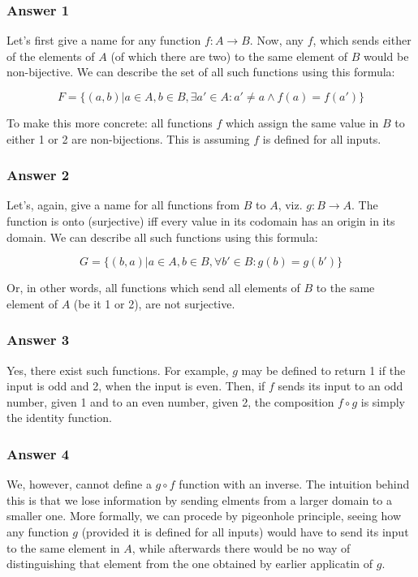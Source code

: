 \documentclass[11pt]{article}
\begin{document}
\subsubsection{Answer 1}
\label{sec-1-1-1}

Let's first give a name for any function $f : A \to B$.  Now, any $f$, which sends
either of the elements of $A$ (of which there are two) to the same element of
$B$ would be non-bijective.  We can describe the set of all such functions using
this formula:

\begin{equation*}
  F = \{(a,b) |
  a \in A,
  b \in B,
  \exists a' \in A: a' \neq a \land f(a) = f(a') \}
\end{equation*}

To make this more concrete: all functions $f$ which assign the same value in $B$ to
either 1 or 2 are non-bijections.  This is assuming $f$ is defined for all inputs.
\subsubsection{Answer 2}
\label{sec-1-1-2}

Let's, again, give a name for all functions from $B$ to $A$, viz. $g : B \to A$.
The function is onto (surjective) iff every value in its codomain has an origin
in its domain.  We can describe all such functions using this formula:

\begin{equation*}
  G = \{(b,a) |
  a \in A,
  b \in B,
  \forall b' \in B: g(b) = g(b') \}
\end{equation*}

Or, in other words, all functions which send all elements of $B$ to the same
element of $A$ (be it 1 or 2), are not surjective.
\subsubsection{Answer 3}
\label{sec-1-1-3}
Yes, there exist such functions.  For example, $g$ may be defined to return
1 if the input is odd and 2, when the input is even.  Then, if $f$ sends
its input to an odd number, given 1 and to an even number, given 2, the
composition $f \circ g$ is simply the identity function.
\subsubsection{Answer 4}
\label{sec-1-1-4}
We, however, cannot define a $g \circ f$ function with an inverse.  The
intuition behind this is that we lose information by sending elments from a
larger domain to a smaller one.  More formally, we can procede by pigeonhole
principle, seeing how any function $g$ (provided it is defined for all
inputs) would have to send its input to the same element in $A$, while
afterwards there would be no way of distinguishing that element from the one
obtained by earlier applicatin of $g$.
\end{document}
